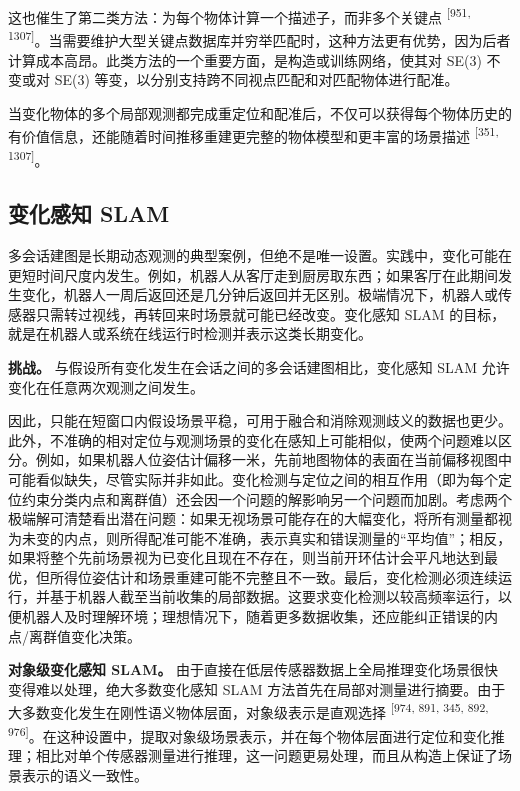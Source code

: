 这也催生了第二类方法：为每个物体计算一个描述子，而非多个关键点 \textsuperscript{[951, 1307]}。当需要维护大型关键点数据库并穷举匹配时，这种方法更有优势，因为后者计算成本高昂。此类方法的一个重要方面，是构造或训练网络，使其对 SE(3) 不变或对 SE(3) 等变，以分别支持跨不同视点匹配和对匹配物体进行配准。

当变化物体的多个局部观测都完成重定位和配准后，不仅可以获得每个物体历史的有价值信息，还能随着时间推移重建更完整的物体模型和更丰富的场景描述 \textsuperscript{[351, 1307]}。

\subsection{变化感知 SLAM}

多会话建图是长期动态观测的典型案例，但绝不是唯一设置。实践中，变化可能在更短时间尺度内发生。例如，机器人从客厅走到厨房取东西；如果客厅在此期间发生变化，机器人一周后返回还是几分钟后返回并无区别。极端情况下，机器人或传感器只需转过视线，再转回来时场景就可能已经改变。变化感知 SLAM 的目标，就是在机器人或系统在线运行时检测并表示这类长期变化。

\textbf{挑战。} 与假设所有变化发生在会话之间的多会话建图相比，变化感知 SLAM 允许变化在任意两次观测之间发生。

因此，只能在短窗口内假设场景平稳，可用于融合和消除观测歧义的数据也更少。此外，不准确的相对定位与观测场景的变化在感知上可能相似，使两个问题难以区分。例如，如果机器人位姿估计偏移一米，先前地图物体的表面在当前偏移视图中可能看似缺失，尽管实际并非如此。变化检测与定位之间的相互作用（即为每个定位约束分类内点和离群值）还会因一个问题的解影响另一个问题而加剧。考虑两个极端解可清楚看出潜在问题：如果无视场景可能存在的大幅变化，将所有测量都视为未变的内点，则所得配准可能不准确，表示真实和错误测量的“平均值”；相反，如果将整个先前场景视为已变化且现在不存在，则当前开环估计会平凡地达到最优，但所得位姿估计和场景重建可能不完整且不一致。最后，变化检测必须连续运行，并基于机器人截至当前收集的局部数据。这要求变化检测以较高频率运行，以便机器人及时理解环境；理想情况下，随着更多数据收集，还应能纠正错误的内点/离群值变化决策。

\textbf{对象级变化感知 SLAM。} 由于直接在低层传感器数据上全局推理变化场景很快变得难以处理，绝大多数变化感知 SLAM 方法首先在局部对测量进行摘要。由于大多数变化发生在刚性语义物体层面，对象级表示是直观选择 \textsuperscript{[974, 891, 345, 892, 976]}。在这种设置中，提取对象级场景表示，并在每个物体层面进行定位和变化推理；相比对单个传感器测量进行推理，这一问题更易处理，而且从构造上保证了场景表示的语义一致性。

